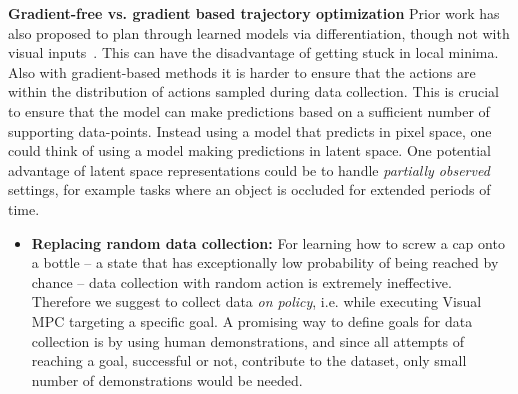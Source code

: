 \documentclass[10pt,journal,compsoc]{IEEEtran}
\begin{document}
\textbf{Gradient-free vs. gradient based trajectory optimization} Prior work has also proposed to plan through learned models via differentiation, though not with visual inputs~\cite{deep_mpc}. This can have the disadvantage of getting stuck in local minima. Also with gradient-based methods it is harder to ensure that the actions are within the distribution of actions sampled during data collection. This is crucial to ensure that the model can make predictions based on a sufficient number of supporting data-points.
Instead using a model that predicts in pixel space, one could think of using a model making predictions in latent space. One potential advantage of latent space representations could be to handle \emph{partially observed} settings, for example tasks where an object is occluded for extended periods of time.
\begin{itemize}
	\item \textbf{Replacing random data collection:} For learning how to screw a cap onto a bottle -- a state that has exceptionally low probability of being reached by chance -- data collection with random action is extremely ineffective. Therefore we suggest to collect data \emph{on policy}, i.e. while executing Visual MPC targeting a specific goal. A promising way to define goals for data collection is by using human demonstrations, and since all attempts of reaching a goal, successful or not, contribute to the dataset, only small number of demonstrations would be needed. 
	

\end{itemize}
\end{document}

